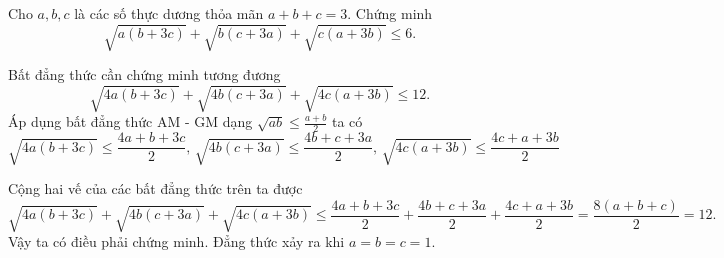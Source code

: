 \begin{problem}
	Cho $a, b, c$ là các số thực dương thỏa mãn $a + b + c = 3$. Chứng minh
	\[
		\sqrt{a(b + 3c)} + \sqrt{b(c + 3a)} + \sqrt{c(a + 3b)} \le 6.
	\]
	\solution

	Bất đẳng thức cần chứng minh tương đương
	\[
		\sqrt{4a(b + 3c)} + \sqrt{4b(c + 3a)} + \sqrt{4c(a + 3b)} \le 12.
	\]
	Áp dụng bất đẳng thức AM - GM dạng $\displaystyle \sqrt{ab} \le \frac{a + b}{2}$ ta có
	$$
		\sqrt{4a(b + 3c)} \le \frac{4a + b + 3c}{2},\, 
		\sqrt{4b(c + 3a)} \le \frac{4b + c + 3a}{2},\,
		\sqrt{4c(a + 3b)} \le \frac{4c + a + 3b}{2}
	$$

	Cộng hai vế của các bất đẳng thức trên ta được
	\[
		\sqrt{4a(b + 3c)} + \sqrt{4b(c + 3a)} + \sqrt{4c(a + 3b)} \le 
		\frac{4a + b + 3c}{2} + \frac{4b + c + 3a}{2} + \frac{4c + a + 3b}{2} =
		\frac{8(a + b + c)}{2} = 12.
	\]
	Vậy ta có điều phải chứng minh. Đẳng thức xảy ra khi $a = b = c = 1$.

\end{problem}